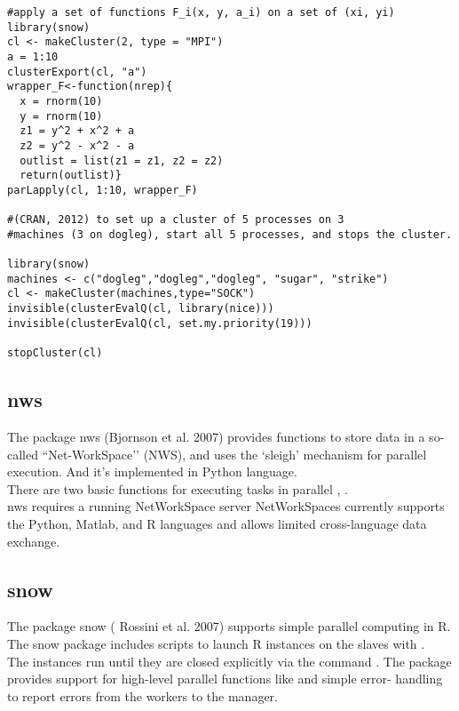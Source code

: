 \documentclass[12pt]{article}
\begin{document}
\begin{lstlisting}[label= Snow01,caption= Snow Example]
#apply a set of functions F_i(x, y, a_i) on a set of (xi, yi)
library(snow)
cl <- makeCluster(2, type = "MPI")
a = 1:10
clusterExport(cl, "a")
wrapper_F<-function(nrep){
  x = rnorm(10)
  y = rnorm(10)
  z1 = y^2 + x^2 + a
  z2 = y^2 - x^2 - a
  outlist = list(z1 = z1, z2 = z2)
  return(outlist)}
parLapply(cl, 1:10, wrapper_F)

#(CRAN, 2012) to set up a cluster of 5 processes on 3
#machines (3 on dogleg), start all 5 processes, and stops the cluster.

library(snow)
machines <- c("dogleg","dogleg","dogleg", "sugar", "strike")
cl <- makeCluster(machines,type="SOCK")
invisible(clusterEvalQ(cl, library(nice)))
invisible(clusterEvalQ(cl, set.my.priority(19)))
 
stopCluster(cl)
\end{lstlisting}
\subsection{nws}

The package nws (Bjornson et al. 2007) provides functions to store data in a so-called  ``Net-WorkSpace’’ (NWS), and uses the `sleigh' mechanism for parallel execution. And it’s implemented in Python language.\\
There are two basic functions for executing tasks in parallel  , .\\
nws requires a running NetWorkSpace server 
NetWorkSpaces currently supports the Python, Matlab, and R languages and allows limited cross-language data exchange.\\


\subsection{snow}

The package snow ( Rossini et al. 2007) supports simple parallel computing in R.\\
The snow package includes scripts to launch R instances on the slaves with .\\
The instances run until they are closed explicitly via the command  . The package provides support for high-level parallel functions like   and simple error-
handling to report errors from the workers to the manager.
\end{document}
